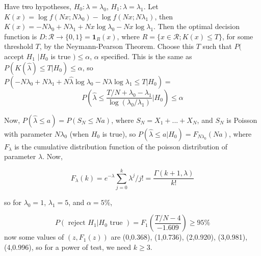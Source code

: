 \documentclass[12pt]{article}
\newcommand{ \cf }[1] { \mathbf{1}_{#1} }
\newcommand{\lam}[0] {  \lambda }
\newcommand{\R}[0] { \mathcal{R} }
\begin{document}
Have two hypotheses, $H_0 : \lam = \lam_0$, $H_1: \lam = \lam_1$. Let $K(x) = \log f(Nx; N\lam_0) - \log f(Nx; N\lam_1)$, then $K(x) = -N \lam_0 + N \lam_1 + Nx \log \lam_0 - Nx \log \lam_1$. Then the optimal decision function is $D: \R \to \{ 0, 1\} = \cf{R}(x)$, where $R = \{ x \in \R; K(x) \le T\}$, for some threshold $T$, by the Neymann-Pearson Theorem. Choose this $T$ such that $P($ accept $H_1$ $| H_0$ is true $) \le \alpha$, $\alpha$ specified. This is the same as $P(K(\hat \lam) \le T | H_0) \le \alpha$, so $P(-N \lam_0 + N \lam_1 + N \hat \lam \log \lam_0 - N \hat \lam \log \lam_1 \le T | H_0) =$ 
$$
P(\hat \lam \le \frac{T/N + \lam_0 - \lam_1}{\log(\lam_0 / \lam_1)} | H_0) \le \alpha
$$


Now, $P(\hat \lam \le a) = P(S_N \le N a)$, where $S_N = X_1 + ... + X_N$, and $S_N$ is Poisson with parameter $N \lam_0$ (when $H_0$ is true), so $P(\hat \lam \le a | H_0 ) = F_{N \lam_0} (N a)$, where $F_\lam$ is the cumulative distribution function of the poisson distribution of parameter $\lam$. Now,

$$
F_{\lam}(k) = e^{-\lam} \sum_{j=0}^k \lam^j/j! = \frac{\Gamma(k+1, \lam)}{k!}
$$




so for $\lam_0 = 1$, $\lam_1 = 5$, and $\alpha = 5\%$, 

$$
P( \text{ reject } H_1 | H_0 \text{ true } ) = F_{1} \left( \frac{T/N - 4 }{-1.609} \right) \ge 95\%
$$
now some values of $(z, F_1(z))$ are (0,0.368), (1,0.736), (2,0.920), (3,0.981), (4,0.996), so for a power of test, we need $k \ge 3$.
\end{document}
